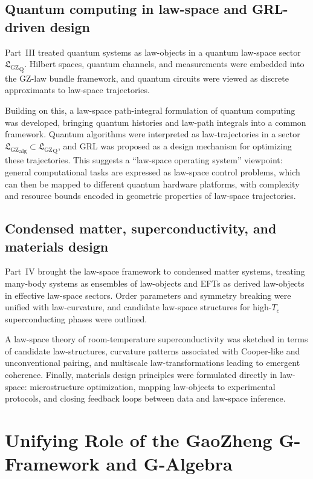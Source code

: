 \documentclass[11pt]{book}
\newcommand{\GZLS}{\ensuremath{\mathfrak{L}_{\mathrm{GZ}}}}
\theoremstyle{plain}
\theoremstyle{definition}
\theoremstyle{remark}
\begin{document}
\subsection*{Quantum computing in law-space and GRL-driven design}

Part~III treated quantum systems as law-objects in a quantum
law-space sector ${\GZLS}_{\mathrm{Q}}$. Hilbert spaces, quantum
channels, and measurements were embedded into the GZ-law bundle
framework, and quantum circuits were viewed as discrete approximants
to law-space trajectories.

Building on this, a law-space path-integral formulation of quantum
computing was developed, bringing quantum histories and law-path
integrals into a common framework. Quantum algorithms were
interpreted as law-trajectories in a sector
${\GZLS}_{\mathrm{alg}} \subset {\GZLS}_{\mathrm{Q}}$, and GRL was
proposed as a design mechanism for optimizing these trajectories.
This suggests a ``law-space operating system'' viewpoint: general
computational tasks are expressed as law-space control problems,
which can then be mapped to different quantum hardware platforms,
with complexity and resource bounds encoded in geometric properties
of law-space trajectories.

\subsection*{Condensed matter, superconductivity, and materials design}

Part~IV brought the law-space framework to condensed matter systems,
treating many-body systems as ensembles of law-objects and EFTs as
derived law-objects in effective law-space sectors. Order parameters
and symmetry breaking were unified with law-curvature, and candidate
law-space structures for high-$T_c$ superconducting phases were
outlined.

A law-space theory of room-temperature superconductivity was
sketched in terms of candidate law-structures, curvature patterns
associated with Cooper-like and unconventional pairing, and
multiscale law-transformations leading to emergent coherence.
Finally, materials design principles were formulated directly in
law-space: microstructure optimization, mapping law-objects to
experimental protocols, and closing feedback loops between data and
law-space inference.

\section*{Unifying Role of the GaoZheng G-Framework and G-Algebra}
\end{document}
